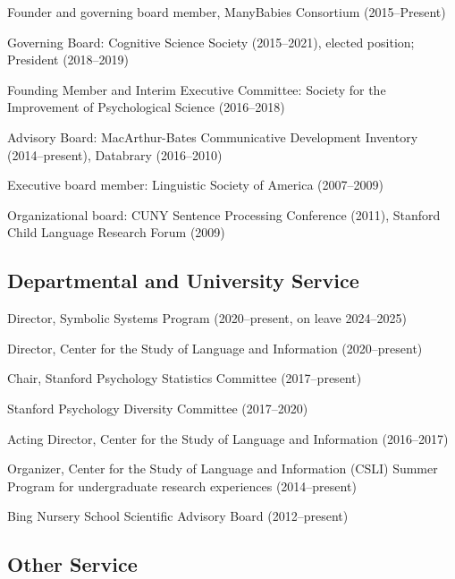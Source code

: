 \documentclass{article}
\renewenvironment{itemize}{
\begin{list}{}{
  \setlength{\leftmargin}{1.5em}
  }
  }{
\end{list}
}
\begin{document}
\begin{itemize}
  \item Founder and governing board member, ManyBabies Consortium (2015--Present)
  \item Governing Board: Cognitive Science Society (2015--2021), elected position; President (2018--2019)
  \item Founding Member and Interim Executive Committee: Society for the Improvement of Psychological Science (2016--2018)
  \item Advisory Board: MacArthur-Bates Communicative Development Inventory (2014--present), Databrary (2016--2010)
  \item Executive board member: Linguistic Society of America (2007--2009)
  \item Organizational board: CUNY Sentence Processing Conference (2011), Stanford Child Language Research Forum (2009)

\end{itemize}


\subsection*{Departmental and University Service}
\begin{itemize}
  \item Director, Symbolic Systems Program (2020--present, on leave 2024--2025)
  \item Director, Center for the Study of Language and Information (2020--present)
  \item Chair, Stanford Psychology Statistics Committee (2017--present)
  \item Stanford Psychology Diversity Committee (2017--2020)
  \item Acting Director, Center for the Study of Language and Information (2016--2017)
  \item Organizer, Center for the Study of Language and Information (CSLI) Summer Program for undergraduate research experiences (2014--present)
  \item Bing Nursery School Scientific Advisory Board (2012--present)
\end{itemize}

\subsection*{Other Service}
\end{document}
